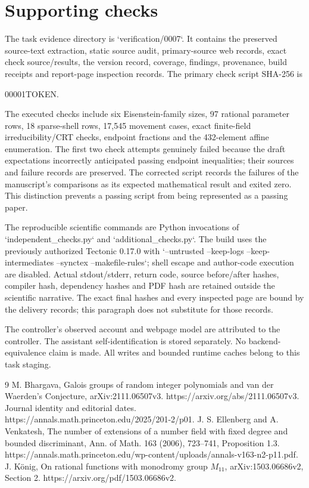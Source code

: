 \documentclass[10pt]{article}
\begin{document}
\section*{Supporting checks}
The task evidence directory is `verification/0007`. It contains the preserved source-text extraction, static source audit, primary-source web records, exact check source/results, the version record, coverage, findings, provenance, build receipts and report-page inspection records. The primary check script SHA-256 is\par
00001TOKEN.\par
The executed checks include six Eisenstein-family sizes, 97 rational parameter rows, 18 sparse-shell rows, 17,545 movement cases, exact finite-field irreducibility/CRT checks, endpoint fractions and the 432-element affine enumeration. The first two check attempts genuinely failed because the draft expectations incorrectly anticipated passing endpoint inequalities; their sources and failure records are preserved. The corrected script records the failures of the manuscript’s comparisons as its expected mathematical result and exited zero. This distinction prevents a passing script from being represented as a passing paper.\par
The reproducible scientific commands are Python invocations of `independent\_checks.py` and `additional\_checks.py`. The build uses the previously authorized Tectonic 0.17.0 with `–untrusted –keep-logs –keep-intermediates –synctex –makefile-rules`; shell escape and author-code execution are disabled. Actual stdout/stderr, return code, source before/after hashes, compiler hash, dependency hashes and PDF hash are retained outside the scientific narrative. The exact final hashes and every inspected page are bound by the delivery records; this paragraph does not substitute for those records.\par
The controller’s observed account and webpage model are attributed to the controller. The assistant self-identification is stored separately. No backend-equivalence claim is made. All writes and bounded runtime caches belong to this task staging.\par
9 M. Bhargava, Galois groups of random integer polynomials and van der Waerden’s Conjecture, arXiv:2111.06507v3. https://arxiv.org/abs/2111.06507v3. Journal identity and editorial dates. https://annals.math.princeton.edu/2025/201-2/p01. J. S. Ellenberg and A. Venkatesh, The number of extensions of a number field with fixed degree and bounded discriminant, Ann. of Math. 163 (2006), 723–741, Proposition 1.3. https://annals.math.princeton.edu/wp-content/uploads/annals-v163-n2-p11.pdf. J. König, On rational functions with monodromy group \(M_{11}\), arXiv:1503.06686v2, Section 2. https://arxiv.org/pdf/1503.06686v2.\par
\end{document}
